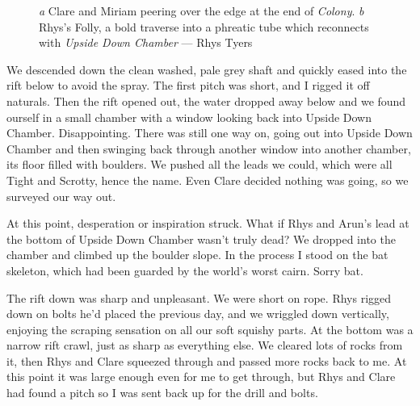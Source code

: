  \begin{figure}[t!]
\checkoddpage \ifoddpage \forcerectofloat \else \forceversofloat \fi
   \centering
     \begin{subfigure}[t]{0.627\textwidth}
        \centering
        \caption{} \label{Top of Upside Down}
    \end{subfigure}
    \hfill
         \begin{subfigure}[t]{0.353\textwidth}
        \centering
        \caption{} \label{Rhys on traverse}
    \end{subfigure}
    \caption{
    \emph{a} Clare and Miriam peering over the edge at the end of \emph{Colony}. 
    \emph{b} Rhys's Folly, a bold traverse into a phreatic tube which reconnects with \emph{Upside Down Chamber} --- Rhys Tyers}
\end{figure}
 
 
We descended down the clean washed, pale grey shaft and quickly eased into the rift below to avoid the spray. The first pitch was short, and I rigged it off naturals. Then the rift opened out, the water dropped away below and we found ourself in a small chamber with a window looking back into Upside Down Chamber. Disappointing. There was still one way on, going out into Upside Down Chamber and then swinging back through another window into another chamber, its floor filled with boulders. We pushed all the leads we could, which were all Tight and Scrotty, hence the name. Even Clare decided nothing was going, so we surveyed our way out.
 
At this point, desperation or inspiration struck. What if Rhys and Arun’s lead at the bottom of Upside Down Chamber wasn’t truly dead? We dropped into the chamber and climbed up the boulder slope. In the process I stood on the bat skeleton, which had been guarded by the world’s worst cairn. Sorry bat.
 
The rift down was sharp and unpleasant. We were short on rope. Rhys rigged down on bolts he’d placed the previous day, and we wriggled down vertically, enjoying the scraping sensation on all our soft squishy parts. At the bottom was a narrow rift crawl, just as sharp as everything else. We cleared lots of rocks from it, then Rhys and Clare squeezed through and passed more rocks back to me. At this point it was large enough even for me to get through, but Rhys and Clare had found a pitch so I was sent back up for the drill and bolts.
 
